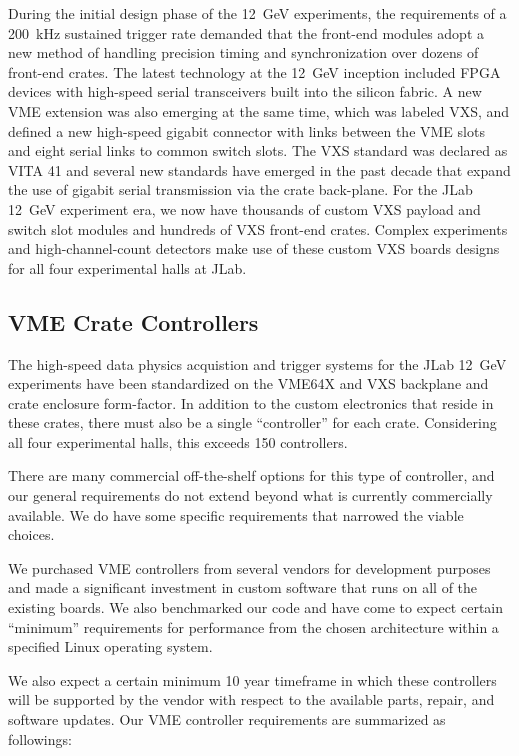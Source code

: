 During the initial design phase of the 12~GeV experiments, the requirements of a 200~kHz sustained trigger rate demanded that the front-end modules adopt a new method of handling precision timing and synchronization over dozens of front-end crates. The latest technology at the 12~GeV inception included FPGA devices with high-speed serial transceivers built into the silicon fabric. A new VME extension was also emerging at the same time, which was labeled VXS, and defined a new high-speed gigabit connector with links between the VME slots and eight serial links to common switch slots. The VXS standard was declared as VITA 41 and several new standards have emerged in the past decade that expand the use of gigabit serial transmission via the crate back-plane. For the JLab 12~GeV experiment era, we now have thousands of custom VXS payload and switch slot modules and hundreds of VXS front-end crates. Complex experiments and high-channel-count detectors make use of these custom VXS boards  designs for all four experimental halls at JLab.

\subsection{VME Crate Controllers}

The high-speed data physics acquistion and trigger systems for the JLab 12~GeV experiments have been standardized on the VME64X and VXS backplane and crate enclosure form-factor. In addition to the custom electronics that reside in these crates, there must also be a single ``controller'' for each crate. Considering all four experimental halls, this exceeds 150 controllers.

There are many commercial off-the-shelf options for this type of controller, and our general requirements do not extend beyond what is currently commercially available. We do have some specific requirements that narrowed the viable choices.

We purchased VME controllers from several vendors for development purposes and made a significant investment in custom software that runs on all of the existing boards. We also benchmarked our code and have come to expect certain ``minimum'' requirements for performance from the chosen architecture within a specified Linux operating system.

We also expect a certain minimum 10 year timeframe in which these controllers will be supported by the vendor with respect to the available parts, repair, and software updates. Our VME controller requirements are summarized as followings:

